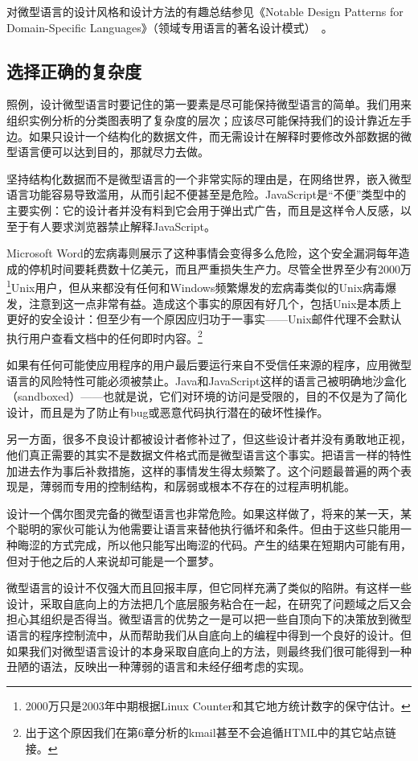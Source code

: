 \documentclass[12pt,oneside]{ctexbook}
\begin{document}
\begin{common-format}
对微型语言的设计风格和设计方法的有趣总结参见《Notable Design Patterns for Domain-Specific Languages》（领域专用语言的著名设计模式）~\cite{Spinellis}。


\subsection{选择正确的复杂度}
照例，设计微型语言时要记住的第一要素是尽可能保持微型语言的简单。我们用来组织实例分析的分类图表明了复杂度的层次；应该尽可能保持我们的设计靠近左手边。如果只设计一个结构化的数据文件，而无需设计在解释时要修改外部数据的微型语言便可以达到目的，那就尽力去做。

坚持结构化数据而不是微型语言的一个非常实际的理由是，在网络世界，嵌入微型语言功能容易导致滥用，从而引起不便甚至是危险。JavaScript是“不便”类型中的主要实例：它的设计者并没有料到它会用于弹出式广告，而且是这样令人反感，以至于有人要求浏览器禁止解释JavaScript。

Microsoft Word的宏病毒则展示了这种事情会变得多么危险，这个安全漏洞每年造成的停机时间要耗费数十亿美元，而且严重损失生产力。尽管全世界至少有2000万\footnote{2000万只是2003年中期根据Linux Counter和其它地方统计数字的保守估计。}Unix用户，但从来都没有任何和Windows频繁爆发的宏病毒类似的Unix病毒爆发，注意到这一点非常有益。造成这个事实的原因有好几个，包括Unix是本质上更好的安全设计：但至少有一个原因应归功于一事实——Unix邮件代理不会默认执行用户查看文档中的任何即时内容。\footnote{出于这个原因我们在第6章分析的kmail甚至不会追循HTML中的其它站点链接。}

如果有任何可能使应用程序的用户最后要运行来自不受信任来源的程序，应用微型语言的风险特性可能必须被禁止。Java和JavaScript这样的语言己被明确地沙盒化（sandboxed）——也就是说，它们对环境的访问是受限的，目的不仅是为了简化设计，而且是为了防止有bug或恶意代码执行潜在的破坏性操作。

另一方面，很多不良设计都被设计者修补过了，但这些设计者并没有勇敢地正视，他们真正需要的其实不是数据文件格式而是微型语言这个事实。把语言一样的特性加进去作为事后补救措施，这样的事情发生得太频繁了。这个问题最普遍的两个表现是，薄弱而专用的控制结构，和孱弱或根本不存在的过程声明机能。

设计一个偶尔图灵完备的微型语言也非常危险。如果这样做了，将来的某一天，某个聪明的家伙可能认为他需要让语言来替他执行循坏和条件。但由于这些只能用一种晦涩的方式完成，所以他只能写出晦涩的代码。产生的结果在短期内可能有用，但对于他之后的人来说却可能是一个噩梦。

微型语言的设计不仅强大而且回报丰厚，但它同样充满了类似的陷阱。有这样一些设计，采取自底向上的方法把几个底层服务粘合在一起，在研究了问题域之后又会担心其组织是否得当。微型语言的优势之一是可以把一些自顶向下的决策放到微型语言的程序控制流中，从而帮助我们从自底向上的编程中得到一个良好的设计。但如果我们对微型语言设计的本身采取自底向上的方法，则最终我们很可能得到一种丑陋的语法，反映出一种薄弱的语言和未经仔细考虑的实现。


\end{common-format}
\end{document}
